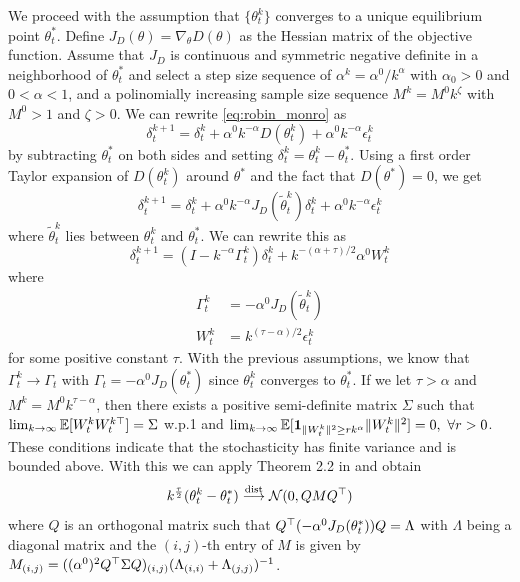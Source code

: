 \documentclass[twoside,11pt]{article}
\begin{document}
We proceed with the assumption that $\{\theta_t^k\}$ converges to a unique equilibrium point $\theta_t^*$. Define $J_D(\theta)=\nabla_\theta D(\theta)$ as the Hessian matrix of the objective function. Assume that $J_D$ is continuous and symmetric negative definite in a neighborhood of $\theta^*_t$ and select a step size sequence of $\alpha^k=\alpha^0/k^\alpha$ with $\alpha_0>0$ and $0<\alpha<1$, and a polinomially increasing sample size sequence $M^k=M^0k^\zeta$ with $M^0>1$ and $\zeta>0$. We can rewrite \eqref{eq:robin_monro} as
\begin{equation}
\delta^{k+1}_t = \delta^k_t + \alpha^0 k^{-\alpha} D(\theta_t^k) + \alpha^0 k^{-\alpha} \epsilon_t^k
\end{equation}
by subtracting $\theta_t^*$ on both sides and setting $\delta_t^k=\theta_t^k-\theta_t^*$. Using a first order Taylor expansion of $D(\theta_t^k)$ around $\theta^*$ and the fact that $D(\theta^*)=0$, we get
\begin{equation}
\delta_t^{k+1} = \delta_t^k + \alpha^0 k^{-\alpha} J_D(\tilde{\theta}_t^k)\delta_t^k + \alpha^0 k^{-\alpha} \epsilon^k_t
\end{equation}
where $\tilde{\theta}_t^k$ lies between $\theta_t^k$ and $\theta^*_t$. We can rewrite this as
\begin{equation}
\delta_t^{k+1}=(I-k^{-\alpha}\Gamma^k_t)\delta_t^k + k^{-(\alpha+\tau)/2}\alpha^0 W_t^k
\end{equation}
where
\begin{align*}
\Gamma_t^k &= -\alpha^0 J_D (\tilde{\theta}_t^k)\\
W_t^k &= k^{(\tau-\alpha)/2} \epsilon_t^k
\end{align*}
for some positive constant $\tau$. With the previous assumptions, we know that $\Gamma_t^k\rightarrow \Gamma_t$ with $\Gamma_t=-\alpha^0 J_D(\theta_t^*)$ since $\theta_t^k$ converges to $\theta_t^*$. If we let $\tau>\alpha$ and $M^k=M^0 k^{\tau-\alpha}$, then there exists a positive semi-definite matrix $\Sigma$ such that $\lim_{k\rightarrow \infty} \mathbb{E}[W^k_t W^{k\top}_t]=\Sigma$ w.p.1 and $\lim_{k\rightarrow\infty} \mathbb{E}[\bm{1}_{\|W_t^k\|^2\geq rk^\alpha}\|W_t^k\|^2]=0, \ \forall r>0$. These conditions indicate that the stochasticity has finite variance and is bounded above.
With this we can apply Theorem 2.2 in \cite{fabian1968asymptotic} and obtain
\begin{equation}
k^{\frac{\tau}{2}}(\theta_t^k-\theta_t^*)\stackrel{\text{dist}}{\longrightarrow} {\cal N}(0, QMQ^\top)
\end{equation}
where $Q$ is an orthogonal matrix such that $Q^\top(-\alpha^0 J_D(\theta_t^*))Q=\Lambda$ with $\Lambda$ being a diagonal matrix and the $(i,j)$-th entry of $M$ is given by $M_{(i,j)}=((\alpha^0)^2 Q^\top\Sigma Q)_{(i,j)}(\Lambda_{(i,i)}+\Lambda_{(j,j)})^{-1}$.
\end{document}
